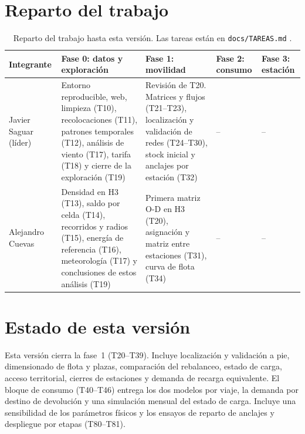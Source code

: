 \documentclass[11pt,a4paper]{article}
\begin{document}
\section*{Reparto del trabajo}

\begin{table}[h]
  \centering\small
  \caption{Reparto del trabajo hasta esta versión. Las tareas están en \texttt{docs/TAREAS.md} \cite{codigo}.}\label{tab:reparto}
  \begin{tabularx}{\textwidth}{@{}lYYYY@{}}
    \toprule
    Integrante & Fase 0: datos y exploración & Fase 1: movilidad & Fase 2: consumo & Fase 3: estación \\
    \midrule
    Javier Saguar (líder) & Entorno reproducible, web, limpieza (T10), recolocaciones (T11), patrones temporales (T12), análisis de viento (T17), tarifa (T18) y cierre de la exploración (T19) & Revisión de T20. Matrices y flujos (T21--T23), localización y validación de redes (T24--T30), stock inicial y anclajes por estación (T32) & -- & -- \\
    \addlinespace
    Alejandro Cuevas & Densidad en H3 (T13), saldo por celda (T14), recorridos y radios (T15), energía de referencia (T16), meteorología (T17) y conclusiones de estos análisis (T19) & Primera matriz O-D en H3 (T20), asignación y matriz entre estaciones (T31), curva de flota (T34) & -- & -- \\
    \bottomrule
  \end{tabularx}
\end{table}

\section*{Estado de esta versión}
Esta versión cierra la fase~1 (T20--T39). Incluye localización y validación a
pie, dimensionado de flota y plazas, comparación del rebalanceo, estado de
carga, acceso territorial, cierres de estaciones y demanda de recarga
equivalente. El bloque de consumo (T40--T46) entrega los dos modelos por
viaje, la demanda por destino de devolución y una simulación mensual del
estado de carga. Incluye una sensibilidad de los parámetros físicos y los
ensayos de reparto de anclajes y despliegue por etapas (T80--T81).

\newpage
{\setlength{\parskip}{0pt}
\tableofcontents
\listoffigures
\listoftables}
\newpage

\end{document}
